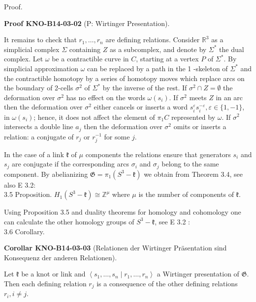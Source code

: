 \documentclass[10pt, letterpaper]{article}
\newcommand{\CustomHeading}[3]{%
  \par\medskip\noindent%
  \textbf{#1 #2} \textnormal{(#3)}.\enskip%
}
\newenvironment{KORO}[2]{\begin{unitbox}\CustomHeading{Corollar}{#1}{#2}}{\end{unitbox}}
\newenvironment{PROOF}[2]{\begin{unitbox}\CustomHeading{Proof}{#1}{#2}}{\end{unitbox}}
\begin{document}
Proof. 

\begin{PROOF}{KNO-B14-03-02}{P: Wirtinger Presentation}
It remains to check that $r_{1}, \ldots, r_{n}$ are defining relations. Consider $\mathbb{R}^{3}$ as a simplicial complex $\Sigma$ containing $Z$ as a subcomplex, and denote by $\Sigma^{*}$ the dual complex. Let $\omega$ be a contractible curve in $C$, starting at a vertex $P$ of $\Sigma^{*}$. By simplicial approximation $\omega$ can be replaced by a path in the 1 -skeleton of $\Sigma^{*}$ and the contractible homotopy by a series of homotopy moves which replace arcs on the boundary of 2-cells $\sigma^{2}$ of $\Sigma^{*}$ by the inverse of the rest. If $\sigma^{2} \cap Z=\emptyset$ the deformation over $\sigma^{2}$ has no effect on the words $\omega\left(s_{i}\right)$. If $\sigma^{2}$ meets $Z$ in an arc then the deformation over $\sigma^{2}$ either cancels or inserts a word $s_{i}^{\varepsilon} s_{i}^{-\varepsilon}, \varepsilon \in\{1,-1\}$, in $\omega\left(s_{i}\right)$; hence, it does not affect the element of $\pi_{1} C$ represented by $\omega$. If $\sigma^{2}$ intersects a double line $a_{j}$ then the deformation over $\sigma^{2}$ omits or inserts a relation: a conjugate of $r_{j}$ or $r_{j}^{-1}$ for some $j$.
\end{PROOF}

In the case of a link $\mathfrak{k}$ of $\mu$ components the relations ensure that generators $s_{i}$ and $s_{j}$ are conjugate if the corresponding arcs $\sigma_{i}$ and $\sigma_{j}$ belong to the same component. By abelianizing $\mathfrak{G}=\pi_{1}\left(S^{3}-\mathfrak{k}\right)$ we obtain from Theorem 3.4, see also E 3.2:\\

3.5 Proposition. $H_{1}\left(S^{3}-\mathfrak{k}\right) \cong \mathbb{Z}^{\mu}$ where $\mu$ is the number of components of $\mathfrak{k}$.

Using Proposition 3.5 and duality theorems for homology and cohomology one can calculate the other homology groups of $S^{3}-\mathfrak{k}$, see E 3.2 :\\


3.6 Corollary. 

\begin{KORO}{KNO-B14-03-03}{Relationen der Wirtinger Präsentation sind Konsequenz der anderen Relationen}
Let $\mathfrak{k}$ be a knot or link and $\left\langle s_{1}, \ldots, s_{n} \mid r_{1}, \ldots, r_{n}\right\rangle$ a Wirtinger presentation of $\mathfrak{G}$. Then each defining relation $r_{j}$ is a consequence of the other defining relations $r_{i}, i \neq j$.
\end{KORO}
\end{document}
